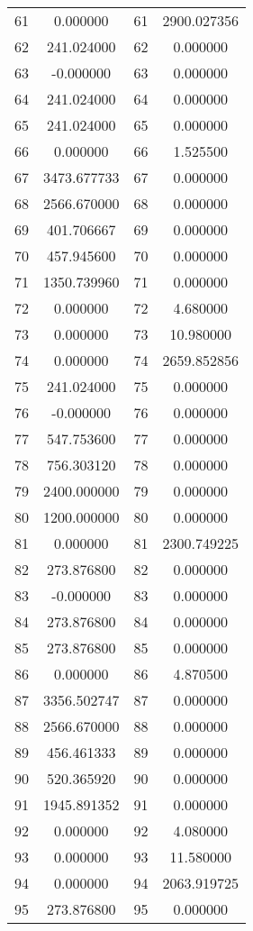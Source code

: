 \documentclass[12pt]{article}
\begin{document}
\begin{longtable}{@{}cccc@{}}
61 & 0.000000 & 61 & 2900.027356 \\
62 & 241.024000 & 62 & 0.000000 \\
63 & -0.000000 & 63 & 0.000000 \\
64 & 241.024000 & 64 & 0.000000 \\
65 & 241.024000 & 65 & 0.000000 \\
66 & 0.000000 & 66 & 1.525500 \\
67 & 3473.677733 & 67 & 0.000000 \\
68 & 2566.670000 & 68 & 0.000000 \\
69 & 401.706667 & 69 & 0.000000 \\
70 & 457.945600 & 70 & 0.000000 \\
71 & 1350.739960 & 71 & 0.000000 \\
72 & 0.000000 & 72 & 4.680000 \\
73 & 0.000000 & 73 & 10.980000 \\
74 & 0.000000 & 74 & 2659.852856 \\
75 & 241.024000 & 75 & 0.000000 \\
76 & -0.000000 & 76 & 0.000000 \\
77 & 547.753600 & 77 & 0.000000 \\
78 & 756.303120 & 78 & 0.000000 \\
79 & 2400.000000 & 79 & 0.000000 \\
80 & 1200.000000 & 80 & 0.000000 \\
81 & 0.000000 & 81 & 2300.749225 \\
82 & 273.876800 & 82 & 0.000000 \\
83 & -0.000000 & 83 & 0.000000 \\
84 & 273.876800 & 84 & 0.000000 \\
85 & 273.876800 & 85 & 0.000000 \\
86 & 0.000000 & 86 & 4.870500 \\
87 & 3356.502747 & 87 & 0.000000 \\
88 & 2566.670000 & 88 & 0.000000 \\
89 & 456.461333 & 89 & 0.000000 \\
90 & 520.365920 & 90 & 0.000000 \\
91 & 1945.891352 & 91 & 0.000000 \\
92 & 0.000000 & 92 & 4.080000 \\
93 & 0.000000 & 93 & 11.580000 \\
94 & 0.000000 & 94 & 2063.919725 \\
95 & 273.876800 & 95 & 0.000000 \\

\end{longtable}
\end{document}
